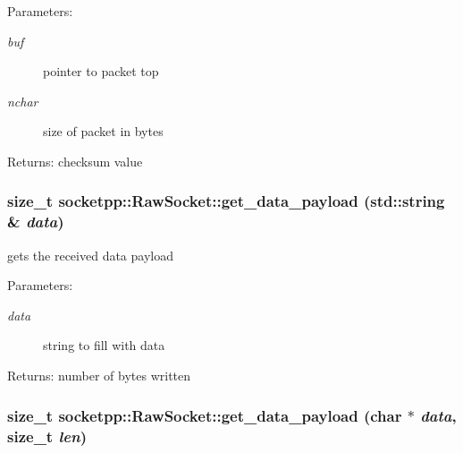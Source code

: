 \begin{Desc}
\item[Parameters:]
\begin{description}
\item[{\em buf}]pointer to packet top \item[{\em nchar}]size of packet in bytes \end{description}
\end{Desc}
\begin{Desc}
\item[Returns:]checksum value \end{Desc}
\hypertarget{classsocketpp_1_1RawSocket_de47c63d60cba25d1ae82f242851610d}{
\subsubsection[{get\_\-data\_\-payload}]{\setlength{\rightskip}{0pt plus 5cm}size\_\-t socketpp::RawSocket::get\_\-data\_\-payload (std::string \& {\em data})}}
\label{classsocketpp_1_1RawSocket_de47c63d60cba25d1ae82f242851610d}


gets the received data payload 

\begin{Desc}
\item[Parameters:]
\begin{description}
\item[{\em data}]string to fill with data \end{description}
\end{Desc}
\begin{Desc}
\item[Returns:]number of bytes written \end{Desc}
\hypertarget{classsocketpp_1_1RawSocket_bd9631abfa5165ad4ed9e2a31640d1f0}{
\subsubsection[{get\_\-data\_\-payload}]{\setlength{\rightskip}{0pt plus 5cm}size\_\-t socketpp::RawSocket::get\_\-data\_\-payload (char $\ast$ {\em data}, \/  size\_\-t {\em len})}}
\label{classsocketpp_1_1RawSocket_bd9631abfa5165ad4ed9e2a31640d1f0}


